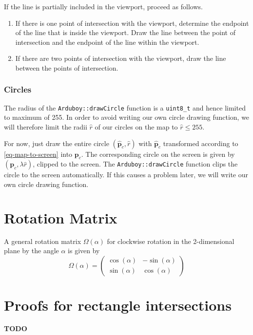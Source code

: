 \documentclass[11pt]{article}
\newcommand{\pbc}{\mathbf{p}_c}
\newcommand{\pbchat}{\hat{\mathbf{p}}_c}
\newcommand{\rhat}{\hat{r}}
\begin{document}
If the line is partially included in the viewport, proceed as follows.
\begin{enumerate}
    \item If there is one point of intersection with the viewport, determine
        the endpoint of the line that is inside the viewport. Draw the line
        between the point of intersection and the endpoint of the line within
        the viewport.
    \item If there are two points of intersection with the viewport, draw the
        line between the points of intersection.
\end{enumerate}

\subsubsection{Circles}
\label{sec-map-drawing-circles}
The radius of the \texttt{Arduboy::drawCircle} function is a \texttt{uint8\_t}
and hence limited to maximum of 255. In order to avoid writing our own circle
drawing function, we will therefore limit the radii $\rhat$ of our circles on 
the map to $\rhat\leq 255$.

For now, just draw the entire circle $(\pbchat, \rhat)$ with $\pbchat$ 
transformed according to \eqref{eq-map-to-screen} into $\pbc$. 
The corresponding circle on the screen is given by $(\pbc, \lambda\rhat)$,
clipped to the screen.
The \texttt{Arduboy::drawCircle} function clips the circle to the screen
automatically. 
If this causes a problem later, we will write our own circle drawing function.
 
\appendix
\section{Rotation Matrix}
\label{appendix-rotation-matrix}
A general rotation matrix $\Omega(\alpha)$ for clockwise rotation in the
2-dimensional plane by the angle $\alpha$ is given by
\begin{equation}
    \Omega(\alpha) = \begin{pmatrix}
        \cos(\alpha) & -\sin(\alpha) \\
        \sin(\alpha) & \cos(\alpha)
    \end{pmatrix}
\end{equation}

\section{Proofs for rectangle intersections}
\label{appendix-proofs-rectangle-intersections}

\textbf{\color{red}TODO}
\end{document}
